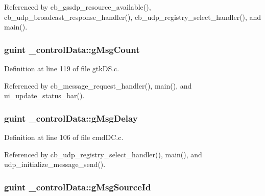 Referenced by cb\+\_\+gssdp\+\_\+resource\+\_\+available(), cb\+\_\+udp\+\_\+broadcast\+\_\+response\+\_\+handler(), cb\+\_\+udp\+\_\+registry\+\_\+select\+\_\+handler(), and main().

\hypertarget{struct__control_data_ae797898f8e5ad5c3128da674f86520d1}{
\subsubsection[{g\+Msg\+Count}]{\setlength{\rightskip}{0pt plus 5cm}guint \+\_\+control\+Data\+::g\+Msg\+Count}}\label{struct__control_data_ae797898f8e5ad5c3128da674f86520d1}


Definition at line 119 of file gtk\+D\+S.\+c.



Referenced by cb\+\_\+message\+\_\+request\+\_\+handler(), main(), and ui\+\_\+update\+\_\+status\+\_\+bar().

\hypertarget{struct__control_data_a277ea878a8491fa38269b6c762a05389}{
\subsubsection[{g\+Msg\+Delay}]{\setlength{\rightskip}{0pt plus 5cm}guint \+\_\+control\+Data\+::g\+Msg\+Delay}}\label{struct__control_data_a277ea878a8491fa38269b6c762a05389}


Definition at line 106 of file cmd\+D\+C.\+c.



Referenced by cb\+\_\+udp\+\_\+registry\+\_\+select\+\_\+handler(), main(), and udp\+\_\+initialize\+\_\+message\+\_\+send().

\hypertarget{struct__control_data_a4be65550b087ca645572b8ebc726250d}{
\subsubsection[{g\+Msg\+Source\+Id}]{\setlength{\rightskip}{0pt plus 5cm}guint \+\_\+control\+Data\+::g\+Msg\+Source\+Id}}\label{struct__control_data_a4be65550b087ca645572b8ebc726250d}


